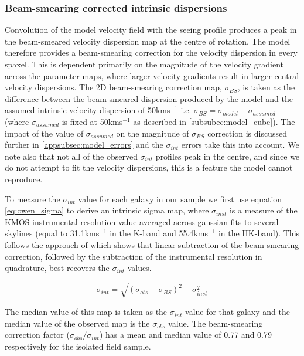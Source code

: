 \documentclass[fleqn,usenatbib]{mn2e}
\begin{document}
\subsubsection{Beam-smearing corrected intrinsic dispersions}\label{subsubsec:beam_smearing_corrected_dispersions}
Convolution of the model velocity field with the seeing profile produces a peak in the beam-smeared velocity dispersion map at the centre of rotation.
The model therefore provides a beam-smearing correction for the velocity dispersion in every spaxel.
This is dependent primarily on the magnitude of the velocity gradient across the parameter maps, where larger velocity gradients result in larger central velocity dispersions.
The 2D beam-smearing correction map, $\sigma_{BS}$, is taken as the difference between the beam-smeared dispersion produced by the model and the assumed intrinsic velocity dispersion of 50kms$^{-1}$ i.e. $\sigma_{BS} = \sigma_{model} - \sigma_{assumed}$ (where $\sigma_{assumed}$ is fixed at 50kms$^{-1}$ as described in \cref{subsubec:model_cube}).
The impact of the value of $\sigma_{assumed}$ on the magnitude of $\sigma_{BS}$ correction is discussed further in \cref{appsubsec:model_errors} and the $\sigma_{int}$ errors take this into account.
We note also that not all of the observed $\sigma_{int}$ profiles peak in the centre, and since we do not attempt to fit the velocity dispersions, this is a feature the model cannot reproduce. 

To measure the $\sigma_{int}$ value for each galaxy in our sample we first use equation \ref{eq:owen_sigma} to derive an intrinsic sigma map, where $\sigma_{inst}$ is a measure of the KMOS instrumental resolution value averaged across gaussian fits to several skylines (equal to 31.1kms$^{-1}$ in the K-band and 55.4kms$^{-1}$ in the HK-band).
This follows the approach of \cite{Stott2016} which shows that linear subtraction of the beam-smearing correction, followed by the subtraction of the instrumental resolution in quadrature, best recovers the $\sigma_{int}$ values. 

\begin{equation}\label{eq:owen_sigma}
   \sigma_{int} = \sqrt{\left(\sigma_{obs} - \sigma_{BS} \right)^{2} - \sigma_{inst}^{2}}
\end{equation}

The median value of this map is taken as the $\sigma_{int}$ value for that galaxy and the median value of the observed map is the $\sigma_{obs}$ value.
The beam-smearing correction factor ($\sigma_{obs}/\sigma_{int}$) has a mean and median value of 0.77 and 0.79 respectively for the isolated field sample. \\
\end{document}
